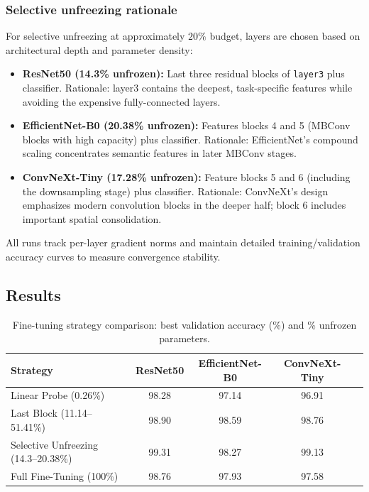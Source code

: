 \documentclass[11pt,a4paper]{article}
\begin{document}
\subsubsection*{Selective unfreezing rationale}
For selective unfreezing at approximately $20\%$ budget, layers are chosen based on architectural depth and parameter density:

\begin{itemize}
	\item \textbf{ResNet50 (14.3\% unfrozen):} Last three residual blocks of \texttt{layer3} plus classifier. Rationale: layer3 contains the deepest, task-specific features while avoiding the expensive fully-connected layers.
	\item \textbf{EfficientNet-B0 (20.38\% unfrozen):} Features blocks 4 and 5 (MBConv blocks with high capacity) plus classifier. Rationale: EfficientNet's compound scaling concentrates semantic features in later MBConv stages.
	\item \textbf{ConvNeXt-Tiny (17.28\% unfrozen):} Feature blocks 5 and 6 (including the downsampling stage) plus classifier. Rationale: ConvNeXt's design emphasizes modern convolution blocks in the deeper half; block 6 includes important spatial consolidation.
\end{itemize}

All runs track per-layer gradient norms and maintain detailed training/validation accuracy curves to measure convergence stability.

\subsection{Results}

\begin{table}[H]
	\centering
	\caption{Fine-tuning strategy comparison: best validation accuracy (\%) and \% unfrozen parameters.}
	\begin{tabular}{lcccc}
		\toprule
		Strategy & ResNet50 & EfficientNet-B0 & ConvNeXt-Tiny \\
		\midrule
		Linear Probe (0.26\%) & 98.28 & 97.14 & 96.91 \\
		Last Block (11.14--51.41\%) & 98.90 & 98.59 & 98.76 \\
		Selective Unfreezing (14.3--20.38\%) & 99.31 & 98.27 & 99.13 \\
		Full Fine-Tuning (100\%) & 98.76 & 97.93 & 97.58 \\
		\bottomrule
	\end{tabular}
\end{table}
\end{document}
